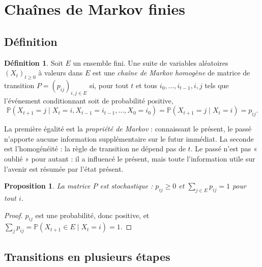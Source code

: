 \documentclass[11pt,a4paper]{article}
\theoremstyle{plain}
\newtheorem{proposition}[theoreme]{Proposition}
\theoremstyle{definition}
\newtheorem{definition}[theoreme]{Définition}
\theoremstyle{remark}
\renewcommand{\P}{\mathbb{P}}
\newcommand{\1}{\mathbf{1}}
\begin{document}
\section{Chaînes de Markov finies}\label{sec-markov}

\subsection{Définition}

\begin{definition}
Soit $E$ un ensemble fini. Une suite de variables aléatoires $(X_t)_{t\ge0}$ à valeurs dans $E$ est une \emph{chaîne de Markov homogène} de matrice de transition $P=(p_{ij})_{i,j\in E}$ si, pour tout $t$ et tous $i_0,\dots,i_{t-1},i,j$ tels que l'événement conditionnant soit de probabilité positive,
\[
\P(X_{t+1}=j\mid X_t=i,X_{t-1}=i_{t-1},\dots,X_0=i_0)=\P(X_{t+1}=j\mid X_t=i)=p_{ij}.
\]
\end{definition}

La première égalité est la \emph{propriété de Markov} : connaissant le présent, le passé n'apporte aucune information supplémentaire sur le futur immédiat. La seconde est l'homogénéité : la règle de transition ne dépend pas de $t$. Le passé n'est pas « oublié » pour autant : il a influencé le présent, mais toute l'information utile sur l'avenir est résumée par l'état présent.

\begin{proposition}
La matrice $P$ est \emph{stochastique} : $p_{ij}\ge0$ et $\sum_{j\in E}p_{ij}=1$ pour tout $i$.
\end{proposition}
\begin{proof}
$p_{ij}$ est une probabilité, donc positive, et $\sum_j p_{ij}=\P(X_{t+1}\in E\mid X_t=i)=1$.
\end{proof}

\subsection{Transitions en plusieurs étapes}
\end{document}
